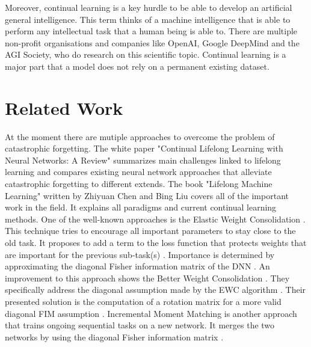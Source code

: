 Moreover, continual learning is a key hurdle to be able to develop an artificial general intelligence.
This term thinks of a machine intelligence that is able to perform any intellectual task that a human being is able to.
There are multiple non-profit organisations and companies like OpenAI, Google DeepMind and the AGI Society, who do research on this scientific topic.
Continual learning is a major part that a model does not rely on a permanent existing dataset.

\section{Related Work}
\label{intro_related_work}

At the moment there are mutiple approaches to overcome the problem of catastrophic forgetting.
The white paper "Continual Lifelong Learning with Neural Networks: A Review" \cite{lifelong_learning_review} summarizes main challenges linked to lifelong learning and compares existing neural network approaches that alleviate catastrophic forgetting to different extends.
The book "Lifelong Machine Learning" \cite{lifelong-machine-learning-book} written by Zhiyuan Chen and Bing Liu covers all of the important work in the field.
It explains all paradigms and current continual learning methods.
\newline
One of the well-known approaches is the Elastic Weight Consolidation \cite{elastic-weight-consolidation}.
This technique tries to encourage all important parameters to stay close to the old task.
It proposes to add a term to the loss function that protects weights that are important for the previous sub-task(s) \cite{elastic-weight-consolidation}. 
Importance is determined by approximating the diagonal Fisher information matrix of the DNN \cite{cf_application_oriented_study, elastic-weight-consolidation}.
An improvement to this approach shows the Better Weight Consolidation \cite{better-weight-consolidation}.
They specifically address the diagonal assumption made by the EWC algorithm \cite{better-weight-consolidation}.
Their presented solution is the computation of a rotation matrix for a more valid diagonal FIM assumption \cite{better-weight-consolidation}.
\newline
Incremental Moment Matching is another approach that trains ongoing sequential tasks on a new network.
It merges the two networks by using the diagonal Fisher information matrix \cite{incremental-moment-matching}.
